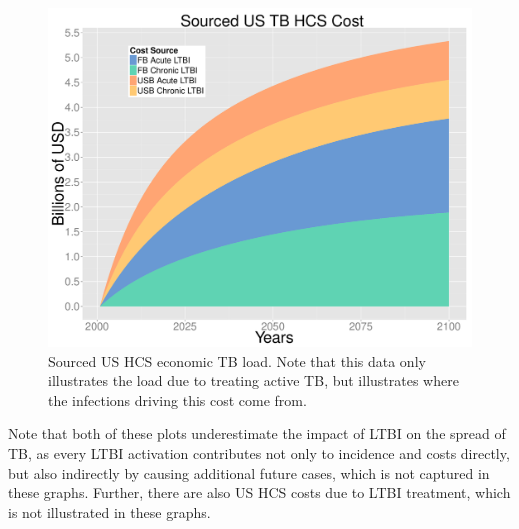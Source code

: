 \documentclass{amsart}
\begin{document}
\begin{figure}[h]
  \begin{center}
    \includegraphics[scale=.35]{costPlotSourced}
  \end{center}
  \caption{Sourced US HCS economic TB load. Note that this data only illustrates
    the load due to treating active TB, but illustrates where the infections
    driving this cost come from.}
  \label{fig:costPlotSourced}
\end{figure}
Note that both of these plots underestimate the impact of LTBI on the spread of
TB, as every LTBI activation contributes not only
to incidence and costs directly, but also indirectly by causing additional
future cases, which is not captured in these graphs. Further, there are also US
HCS costs due to LTBI treatment, which is not illustrated in these graphs. 
\end{document}

